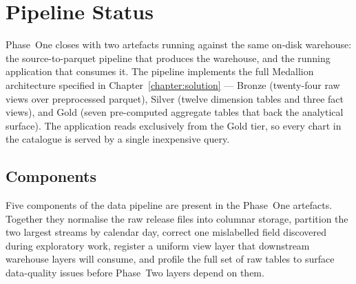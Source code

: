\section{Pipeline Status}
\label{sec:impl:pipeline}

Phase~One closes with two artefacts running against the same on-disk
warehouse: the source-to-parquet pipeline that produces the warehouse,
and the running application that consumes it. The pipeline implements
the full Medallion architecture specified in
Chapter~\ref{chapter:solution} --- Bronze (twenty-four raw views over
preprocessed parquet), Silver (twelve dimension tables and three fact
views), and Gold (seven pre-computed aggregate tables that back the
analytical surface). The application reads exclusively from the Gold
tier, so every chart in the catalogue is served by a single
inexpensive query.

\subsection{Components}
\label{sec:impl:pipeline:implemented}

Five components of the data pipeline are present in the Phase~One
artefacts. Together they normalise the raw release files into columnar
storage, partition the two largest streams by calendar day, correct
one mislabelled field discovered during exploratory work, register a
uniform view layer that downstream warehouse layers will consume, and
profile the full set of raw tables to surface data-quality issues
before Phase~Two layers depend on them.

